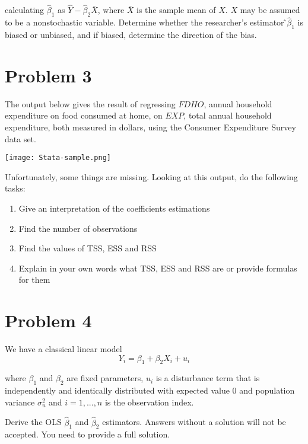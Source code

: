 \documentclass[12pt,letterpaper]{article}
\begin{document}
calculating $\hat \beta_1$ as $\hat Y - \hat \beta_2 \bar X$, where $\bar X$ is the sample mean of $X$. $X$ may be assumed to be a nonstochastic variable. Determine whether the researcher’s estimator ̂$\hat \beta_1$ is biased or unbiased, and if biased, determine the direction of the bias.


\section*{Problem 3}
The output below gives the result of regressing $FDHO$, annual household expenditure on food consumed at home, on $EXP$, total annual household expenditure, both measured in dollars, using the Consumer Expenditure Survey data set. 

\texttt{[image: Stata-sample.png]}

Unfortunately, some things are missing. Looking at this output, do the following tasks:

\begin{enumerate}
    \item 
    Give an interpretation of the coefficients estimations
    
    \item
    Find the number of observations
    
    \item
    Find the values of TSS, ESS and RSS
    
    \item
    Explain in your own words what TSS, ESS and RSS are or provide formulas for them
\end{enumerate}


\section*{Problem 4}
We have a classical linear model 
\begin{equation*}
    Y_i = \beta_1 + \beta_2 X_i + u_i
\end{equation*}

where $\beta_1$ and $\beta_2$ are fixed parameters, $u_i$ is a disturbance term that is independently and identically distributed with expected value 0 and population variance $\sigma_u^2$ and $i = {1, ..., n}$ is the observation index.

Derive the OLS  $\hat \beta_1$ and $\hat \beta_2$ estimators. Answers without a solution will not be accepted. You need to provide a full solution.
\end{document}
